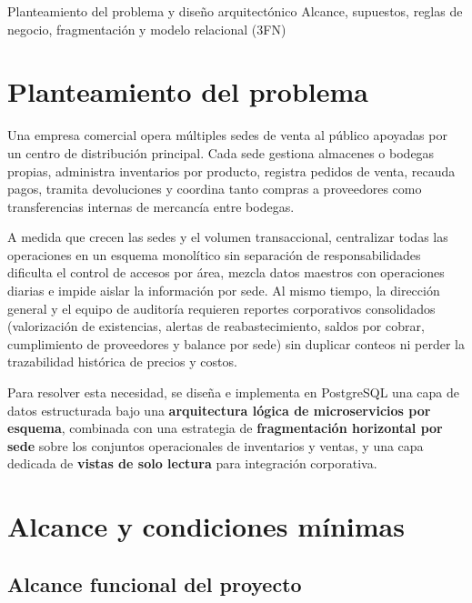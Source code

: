 \documentclass[11pt,oneside]{article}
\begin{document}
  {Planteamiento del problema y dise\~no arquitect\'onico}
  {Alcance, supuestos, reglas de negocio, fragmentaci\'on y modelo relacional (3FN)}

\tableofcontents
\vspace{0.5em}

\section{Planteamiento del problema}

Una empresa comercial opera m\'ultiples sedes de venta al p\'ublico apoyadas por
un centro de distribuci\'on principal. Cada sede gestiona almacenes o bodegas
propias, administra inventarios por producto, registra pedidos de venta,
recauda pagos, tramita devoluciones y coordina tanto compras a proveedores como
transferencias internas de mercanc\'ia entre bodegas.

A medida que crecen las sedes y el volumen transaccional, centralizar todas las
operaciones en un esquema monol\'itico sin separaci\'on de responsabilidades
dificulta el control de accesos por \'area, mezcla datos maestros con
operaciones diarias e impide aislar la informaci\'on por sede. Al mismo tiempo,
la direcci\'on general y el equipo de auditor\'ia requieren reportes
corporativos consolidados (valorizaci\'on de existencias, alertas de
reabastecimiento, saldos por cobrar, cumplimiento de proveedores y balance
por sede) sin duplicar conteos ni perder la trazabilidad hist\'orica de
precios y costos.

Para resolver esta necesidad, se dise\~na e implementa en PostgreSQL una capa
de datos estructurada bajo una \textbf{arquitectura l\'ogica de microservicios
por esquema}, combinada con una estrategia de \textbf{fragmentaci\'on horizontal
por sede} sobre los conjuntos operacionales de inventarios y ventas, y una
capa dedicada de \textbf{vistas de solo lectura} para integraci\'on corporativa.

\section{Alcance y condiciones m\'inimas}

\subsection{Alcance funcional del proyecto}
\end{document}
